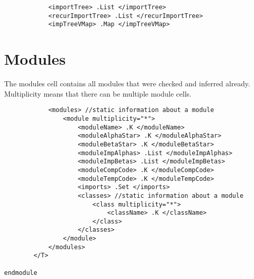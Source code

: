 \begin{lstlisting}
            <importTree> .List </importTree>
            <recurImportTree> .List </recurImportTree>
            <impTreeVMap> .Map </impTreeVMap>
\end{lstlisting}

\section{Modules}

The modules cell contains all modules that were checked and inferred already. Multiplicity means that there can be multiple module cells.

\begin{lstlisting}
            <modules> //static information about a module
                <module multiplicity="*">
                    <moduleName> .K </moduleName>
                    <moduleAlphaStar> .K </moduleAlphaStar>
                    <moduleBetaStar> .K </moduleBetaStar>
                    <moduleImpAlphas> .List </moduleImpAlphas>
                    <moduleImpBetas> .List </moduleImpBetas>
                    <moduleCompCode> .K </moduleCompCode>
                    <moduleTempCode> .K </moduleTempCode>
                    <imports> .Set </imports>
                    <classes> //static information about a module
                        <class multiplicity="*">
                            <className> .K </className>
                        </class>
                    </classes>
                </module>
            </modules>
        </T>

endmodule
\end{lstlisting}
